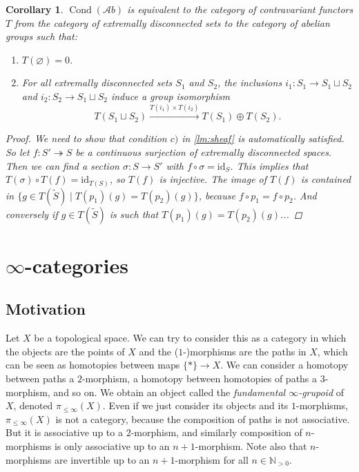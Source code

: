 \documentclass[11pt,A4]{article}
\theoremstyle{plain}
\newtheorem{cor}[thm]{Corollary}
\theoremstyle{definition}
\theoremstyle{remark}
\newcommand{\N}{\mathbb{N}}
\newcommand{\Ab}{\mathscr{A}b}
\DeclareMathOperator{\Cond}{Cond}
\newcommand{\op}{\oplus}
\newcommand{\id}{\mathrm{id}}
\begin{document}
\begin{cor}\label{cor:sheaf}
    $\Cond(\Ab)$ is equivalent to the category of contravariant functors $T$ from the category of extremally disconnected sets to the category of abelian groups such that:
    \begin{enumerate}[label=\alph*)]
	\item $T(\varnothing)=0$.
	\item For all extremally disconnected sets $S_{1}$ and $S_{2}$, the inclusions $i_{1}\colon S_{1}\to S_{1}\sqcup S_{2}$ and $i_{2}\colon S_{2}\to S_{1}\sqcup S_{2}$ induce a group isomorphism
	    \[ T(S_{1}\sqcup S_{2})\xrightarrow{T(i_{1})\times T(i_{2})} T(S_{1})\op T(S_{2}).\]
    \end{enumerate}
    \begin{proof}
	We need to show that condition $c)$ in \cref{lm:sheaf} is automatically satisfied.
	So let $f\colon S'\twoheadrightarrow S$ be a continuous surjection of extremally disconnected spaces.
	Then we can find a section $\sigma\colon S\to S'$ with $f\circ \sigma =\id_{S}$.
	This implies that $T(\sigma)\circ T(f)=\id_{T(S)}$, so $T(f)$ is injective.
	The image of $T(f)$ is contained in $\{ g\in T(\tilde{S})\mid T(p_{1})(g)=T(p_{2})(g)\}$, because $f\circ p_{1}=f\circ p_{2}$.
	And conversely if $g\in T(\tilde{S})$ is such that $T(p_{1})(g)=T(p_{2})(g)$...
    \end{proof}
\end{cor}

\section{$\infty$-categories}

\subsection{Motivation}

Let $X$ be a topological space.
We can try to consider this as a category in which the objects are the points of $X$ and the ($1$-)morphisms are the paths in $X$, which can be seen as homotopies between maps $\{ *\}\to X$.
We can consider a homotopy between paths a $2$-morphism, a homotopy between homotopies of paths a $3$-morphism, and so on.
We obtain an object called the \textit{fundamental $\infty$-grupoid} of $X$, denoted $\pi_{\leqslant \infty}(X)$.
Even if we just consider its objects and its $1$-morphisms, $\pi_{\leqslant \infty }(X)$ is not a category, because the composition of paths is not associative.
But it is associative up to a $2$-morphism, and similarly composition of $n$-morphisms is only associative up to an $n+1$-morphism.
Note also that $n$-morphisms are invertible up to an $n+1$-morphism for all $n\in \N_{>0}$.
\end{document}
